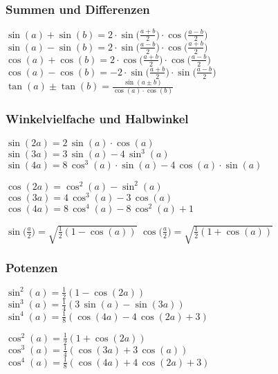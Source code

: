 \subsubsection{Summen und Differenzen}

$\sin(a) + \sin(b) = 2 \cdot \sin \big( \frac{a+b}{2} \big) \cdot \cos \big( \frac{a-b}{2} \big)$ \\
$\sin(a) - \sin(b) = 2 \cdot \sin \big( \frac{a-b}{2} \big) \cdot \cos \big( \frac{a+b}{2} \big)$ \\
$\cos(a) + \cos(b) = 2 \cdot \cos \big( \frac{a+b}{2} \big) \cdot \cos \big( \frac{a-b}{2} \big)$ \\
$\cos(a) - \cos(b) = -2 \cdot \sin \big( \frac{a+b}{2} \big) \cdot \sin \big( \frac{a-b}{2} \big)$ \\
$\tan(a) \pm \tan(b) = \frac{\sin(a \pm b)}{\cos(a) \cdot \cos(b)}$ 
    

    
    
\subsubsection{Winkelvielfache und Halbwinkel}
$\sin(2a) = 2 \, \sin(a) \cdot \cos(a)$ \\
$\sin(3a) = 3 \, \sin(a) -4 \, \sin^3(a)$ \\ 
$\sin(4a) = 8 \, \cos^3(a) \cdot \sin(a) - 4 \, \cos(a) \cdot \sin(a)$

$\cos(2a) = \cos^2(a) - \sin^2(a)$ \\
$\cos(3a) = 4 \, \cos^3(a) -3 \, \cos(a)$ \\ 
$\cos(4a) = 8 \, \cos^4(a) - 8 \, \cos^2(a) + 1$

$\sin \big( \frac{a}{2} \big) = \sqrt{\frac{1}{2}(1-\cos(a))} $ \qquad $\cos \big( \frac{a}{2} \big) = \sqrt{\frac{1}{2}(1+\cos(a))} $ 


\subsubsection{Potenzen}
$\sin^2(a) = \frac{1}{2}(1-\cos(2a))$ \\	
$\sin^3(a) = \frac{1}{4}(3\, \sin(a) - \sin(3a))$ \\	
$\sin^4(a) = \frac{1}{8}(\cos(4a) -4 \, \cos(2a) +3)$

$\cos^2(a) = \frac{1}{2}(1+\cos(2a))$ \\	
$\cos^3(a) = \frac{1}{4}(\cos(3a) + 3 \, \cos(a))$ \\	
$\cos^4(a) = \frac{1}{8}(\cos(4a) +4 \, \cos(2a) +3)$ 



